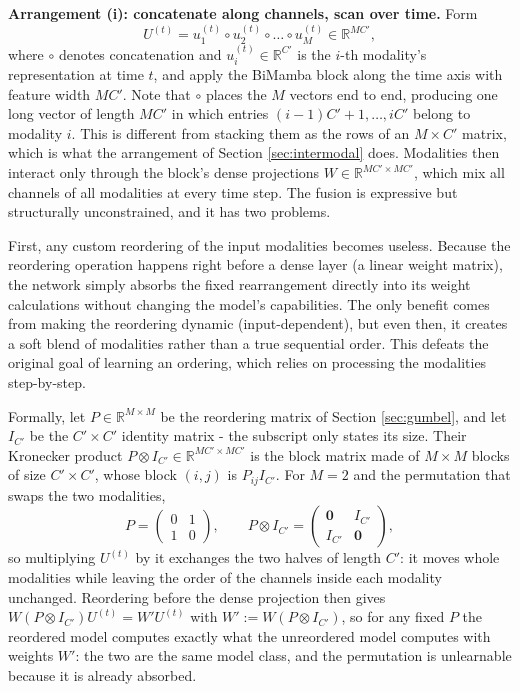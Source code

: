 \documentclass[10pt,a4paper,twocolumn]{article}
\newcommand{\R}{\mathbb{R}}
\begin{document}
	\textbf{Arrangement (i): concatenate along channels, scan over time.} Form $$U^{(t)} = u_1^{(t)} \circ u_2^{(t)} \circ \dots \circ u_M^{(t)} \in \R^{MC'},$$ where $\circ$ denotes concatenation and $u_i^{(t)} \in \R^{C'}$ is the $i$-th modality's representation at time $t$, and apply the BiMamba block along the time axis with feature width $MC'$. Note that $\circ$ places the $M$ vectors end to end, producing one long vector of length $MC'$ in which entries $(i-1)C'+1, \dots, iC'$ belong to modality $i$. This is different from stacking them as the rows of an $M \times C'$ matrix, which is what the arrangement of Section \ref{sec:intermodal} does. Modalities then interact only through the block's dense projections $W \in \R^{MC' \times MC'}$, which mix all channels of all modalities at every time step. The fusion is expressive but structurally unconstrained, and it has two problems.

	First, any custom reordering of the input modalities becomes useless. Because the reordering operation happens right before a dense layer (a linear weight matrix), the network simply absorbs the fixed rearrangement directly into its weight calculations without changing the model's capabilities. The only benefit comes from making the reordering dynamic (input-dependent), but even then, it creates a soft blend of modalities rather than a true sequential order. This defeats the original goal of learning an ordering, which relies on processing the modalities step-by-step.
	
	Formally, let $P \in \R^{M \times M}$ be the reordering matrix of Section \ref{sec:gumbel}, and let $I_{C'}$ be the $C' \times C'$ identity matrix - the subscript only states its size. Their Kronecker product $P \otimes I_{C'} \in \R^{MC' \times MC'}$ is the block matrix made of $M \times M$ blocks of size $C' \times C'$, whose block $(i,j)$ is $P_{ij} I_{C'}$. For $M = 2$ and the permutation that swaps the two modalities,
	$$P = \begin{pmatrix} 0 & 1 \\ 1 & 0 \end{pmatrix}, \qquad P \otimes I_{C'} = \begin{pmatrix} \mathbf{0} & I_{C'} \\ I_{C'} & \mathbf{0} \end{pmatrix},$$
	so multiplying $U^{(t)}$ by it exchanges the two halves of length $C'$: it moves whole modalities while leaving the order of the channels inside each modality unchanged. Reordering before the dense projection then gives $W(P \otimes I_{C'})U^{(t)} = W'U^{(t)}$ with $W' := W(P \otimes I_{C'})$, so for any fixed $P$ the reordered model computes exactly what the unreordered model computes with weights $W'$: the two are the same model class, and the permutation is unlearnable because it is already absorbed.
	
\end{document}
